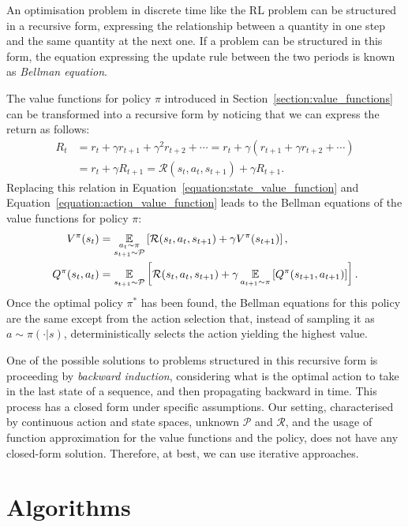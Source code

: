 An optimisation problem in discrete time like the \ac{RL} problem can be structured in a recursive form, \ie expressing the relationship between a quantity in one step and the same quantity at the next one.
If a problem can be structured in this form, the equation expressing the update rule between the two periods is known as \emph{Bellman equation}.

The value functions for policy $\pi$ introduced in Section~\ref{section:value_functions} can be transformed into a recursive form by noticing that we can express the return as follows:
%
\begin{align*}
    R_t
    &= r_t + \gamma r_{t+1} + \gamma^2 r_{t+2} + \cdots = r_t + \gamma \left( r_{t+1} + \gamma r_{t+2} + \cdots \right) \\
    &= r_t + \gamma R_{t+1} = \mathcal{R}(s_t, a_t, s_{t+1}) + \gamma R_{t+1}.
\end{align*}
%
Replacing this relation in Equation~\eqref{equation:state_value_function} and Equation~\eqref{equation:action_value_function} leads to the Bellman equations of the value functions for policy $\pi$:
%
\begin{align*}
    V^\pi(s_t) 
    &= \operatorname*{\mathbb{E}}_{\substack{a_t \sim \pi \\ s_{t+1} \sim \mathcal{P}}} \left[ \mathcal{R}(s_t, a_t, s_{t+1}) + \gamma V^\pi(s_{t+1}) \right] ,\\
    Q^\pi(s_t, a_t) 
    &= \operatorname*{\mathbb{E}}_{s_{t+1} \sim \mathcal{P}} \left[ \mathcal{R}(s_t, a_t, s_{t+1}) + \gamma \operatorname*{\mathbb{E}}_{a_{t+1} \sim \pi} \left[  Q^\pi(s_{t+1}, a_{t+1}) \right] \right] .
\end{align*}
%
Once the optimal policy $\pi^*$ has been found, the Bellman equations for this policy are the same except from the action selection that, instead of sampling it as $a \sim \pi(\cdot|s)$, deterministically selects the action yielding the highest value.

One of the possible solutions to problems structured in this recursive form is proceeding by \emph{backward induction}, \ie considering what is the optimal action to take in the last state of a sequence, and then propagating backward in time.
This process has a closed form under specific assumptions.
Our setting, characterised by continuous action and state spaces, unknown $\mathcal{P}$ and $\mathcal{R}$, and the usage of function approximation for the value functions and the policy, does not have any closed-form solution.
Therefore, at best, we can use iterative approaches.

\section{Algorithms}

